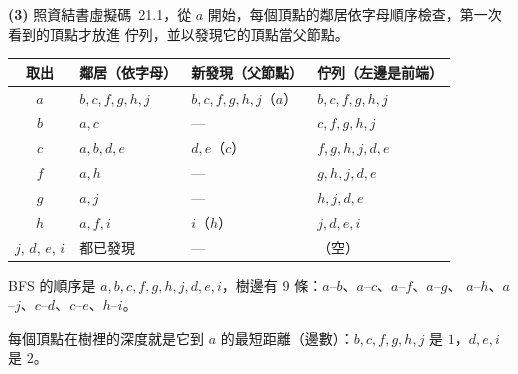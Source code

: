 \begin{pastsoln}
\textbf{(3)} 照資結書虛擬碼~21.1，從 $a$ 開始，每個頂點的鄰居依字母順序檢查，第一次看到的頂點才放進
佇列，並以發現它的頂點當父節點。
\begin{center}
\small
\begin{tabular}{clll}
\toprule
取出 & 鄰居（依字母） & 新發現（父節點） & 佇列（左邊是前端） \\
\midrule
$a$ & $b, c, f, g, h, j$ & $b, c, f, g, h, j$（$a$） & $b, c, f, g, h, j$ \\
$b$ & $a, c$ & — & $c, f, g, h, j$ \\
$c$ & $a, b, d, e$ & $d, e$（$c$） & $f, g, h, j, d, e$ \\
$f$ & $a, h$ & — & $g, h, j, d, e$ \\
$g$ & $a, j$ & — & $h, j, d, e$ \\
$h$ & $a, f, i$ & $i$（$h$） & $j, d, e, i$ \\
$j$, $d$, $e$, $i$ & 都已發現 & — & （空） \\
\bottomrule
\end{tabular}
\end{center}
BFS 的順序是 $a, b, c, f, g, h, j, d, e, i$，樹邊有 $9$ 條：$a$--$b$、$a$--$c$、$a$--$f$、$a$--$g$、
$a$--$h$、$a$--$j$、$c$--$d$、$c$--$e$、$h$--$i$。
\begin{center}
\end{center}
每個頂點在樹裡的深度就是它到 $a$ 的最短距離（邊數）：$b, c, f, g, h, j$ 是 $1$，$d, e, i$ 是 $2$。
\end{pastsoln}

